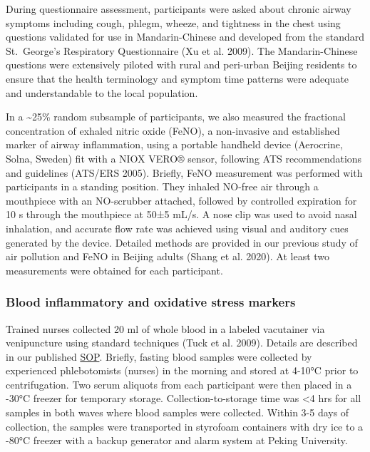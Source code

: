 \documentclass[
  letterpaper,
  DIV=11,
  numbers=noendperiod]{scrartcl}
\begin{document}
During questionnaire assessment, participants were asked about chronic
airway symptoms including cough, phlegm, wheeze, and tightness in the
chest using questions validated for use in Mandarin-Chinese and
developed from the standard St.~George's Respiratory Questionnaire
 (Xu et al. 2009). The Mandarin-Chinese questions were
extensively piloted with rural and peri-urban Beijing residents to
ensure that the health terminology and symptom time patterns were
adequate and understandable to the local population.

In a \textasciitilde25\% random subsample of participants, we also
measured the fractional concentration of exhaled nitric oxide (FeNO), a
non-invasive and established marker of airway inflammation, using a
portable handheld device (Aerocrine, Solna, Sweden) fit with a NIOX
VERO® sensor, following ATS recommendations and guidelines (ATS/ERS
2005). Briefly, FeNO measurement was performed with participants in a
standing position. They inhaled NO-free air through a mouthpiece with an
NO-scrubber attached, followed by controlled expiration for 10 s through
the mouthpiece at 50±5 mL/s. A nose clip was used to avoid nasal
inhalation, and accurate flow rate was achieved using visual and
auditory cues generated by the device. Detailed methods are provided in
our previous study of air pollution and FeNO in Beijing adults (Shang et
al. 2020). At least two measurements were obtained for each participant.

\subsubsection{Blood inflammatory and oxidative stress
markers}\label{blood-inflammatory-and-oxidative-stress-markers}

Trained nurses collected 20 ml of whole blood in a labeled vacutainer
via venipuncture using standard techniques (Tuck et al. 2009). Details
are described in our published \href{https://osf.io/zwpfg}{SOP}.
Briefly, fasting blood samples were collected by experienced
phlebotomists (nurses) in the morning and stored at 4-10°C prior to
centrifugation. Two serum aliquots from each participant were then
placed in a -30°C freezer for temporary storage. Collection-to-storage
time was \textless4 hrs for all samples in both waves where blood
samples were collected. Within 3-5 days of collection, the samples were
transported in styrofoam containers with dry ice to a -80°C freezer with
a backup generator and alarm system at Peking University.
\end{document}
